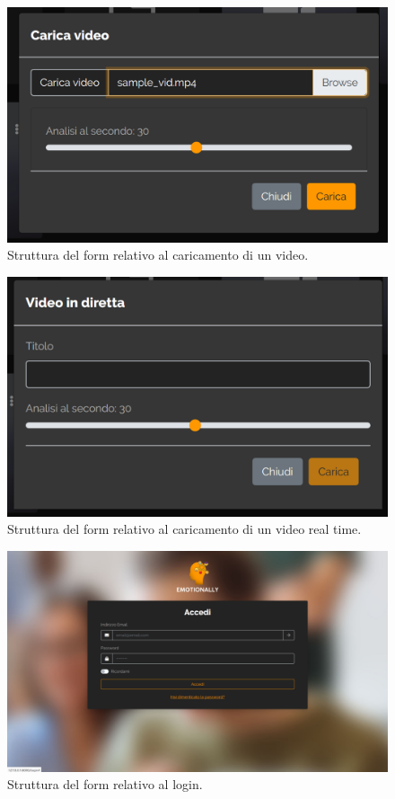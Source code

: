 \begin{figure}[H]
	\centering

	\caption{Struttura del form relativo al caricamento di un video.}
	\label{fig:struttura-form:carica-video}
	\includegraphics[width=\textwidth]{images/struttura-form/form-carica-video}
\end{figure}

\begin{figure}[H]
	\centering
	\caption{Struttura del form relativo al caricamento di un video real time.}
	\label{fig:struttura-form:carica-video-realtime}
	\includegraphics[width=\textwidth]{images/struttura-form/form-video-diretta}
\end{figure}

\begin{figure}[H]
	\centering
	\caption{Struttura del form relativo al login.}
	\label{fig:struttura-form:login}
	\includegraphics[width=\textwidth]{images/struttura-form/form-login}
\end{figure}

